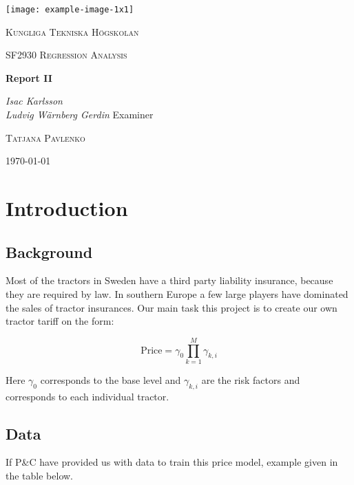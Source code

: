 \documentclass[11pt]{article}
\author{Ludde}
\date{\today}
\title{}
\begin{document}
\begin{titlepage}
\centering
\texttt{[image: example-image-1x1]}\par\vspace{1cm}
{\scshape\LARGE Kungliga Tekniska Högskolan \par}
\vspace{1cm}
{\scshape\Large SF2930 Regression Analysis \par}
\vspace{1.5cm}
{\huge\bfseries Report II \\  \par}
\vspace{2cm}
{\Large\itshape Isac Karlsson \\ Ludvig Wärnberg Gerdin}
\vfill
Examiner \par
\textsc{Tatjana Pavlenko}

\vfill

{\large \today\par}
\end{titlepage}

\newpage
\tableofcontents
\newpage

\section{Introduction}
\label{sec:orgd147064}
\subsection{Background}
\label{sec:org969fd46}
Most of the tractors in Sweden have a third party liability insurance, because they are required by law. 
In southern Europe a few large players have dominated the sales of tractor insurances. Our main task this
project is to create our own tractor tariff on the form:

\begin{equation}
\label{eq:orga73dda6}
  \text{Price} = \gamma_0 \prod_{k = 1}^M \gamma_{k,i}  
\end{equation}

Here \(\gamma_{\text{0}}\) corresponds to the base level and \(\gamma_{k,i}\) are the risk factors and corresponds to 
each individual tractor. 

\subsection{Data}
\label{sec:org4c2573d}

If P\&C have provided us with data to train this price model, example given in the table below.
\end{document}
